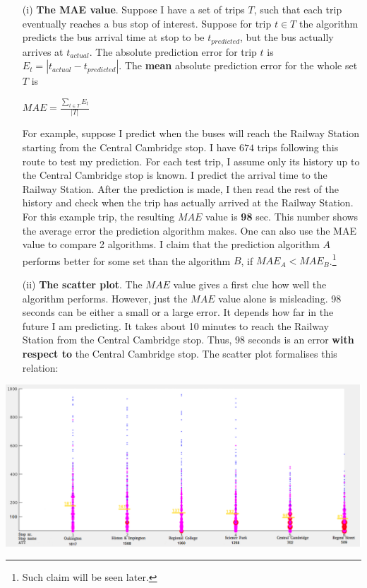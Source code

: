 \documentclass[12pt,a4paper,oneside,openright]{report}
\begin{document}
\begin{enumerate}
\item[(i)]
    \textbf{The MAE value}. Suppose I have a set
    of trips $T$, such that each trip eventually reaches a bus stop of interest. 
    Suppose for trip $t \in T$ the algorithm predicts the bus arrival time
    at stop to be $t_{predicted}$, but the bus actually arrives at $t_{actual}$.
    The absolute prediction error for trip $t$ is
    $E_t = |t_{actual} - t_{predicted}|$. The \textbf{mean} absolute prediction
    error for the whole set $T$ is

    \begin{center}
        $MAE = \frac{\sum\nolimits_{t \in {T}}{E_t}}{|T|}$
    \end{center}

    For example, suppose I predict when the buses will reach the Railway Station
    starting from the Central Cambridge stop. I have $674$ trips
    following this route to test my prediction. For each test trip, I assume
    only its history up to the Central Cambridge stop is known. I predict
    the arrival time to the Railway Station. After the prediction is made,
    I then read the rest of the history and check when the trip has actually
    arrived at the Railway Station. For this example trip, the resulting
    $MAE$ value is \textbf{98} sec. This number shows the average error the
    prediction algorithm makes. One can also use the MAE value to compare
    2 algorithms. I claim that the prediction algorithm $A$ performs better
    for some set than the algorithm $B$, if $MAE_A < MAE_B$.\footnote{Such claim will
    be seen later.}

\item[(ii)] \textbf{The scatter plot}. The $MAE$ value gives a first
   clue how well the algorithm performs. However, just the $MAE$ value
   alone is misleading. 98 seconds can be either a small or a large
   error. It depends how far in the future I am predicting. It takes about 10 
   minutes to reach the Railway Station from the Central Cambridge stop. Thus,
   98 seconds is an error \textbf{with respect to} the Central Cambridge stop. 
   The scatter plot formalises this relation:


\end{enumerate}

\includegraphics[width=\textwidth]{figs/scatter_plot.png} \\
\end{document}
